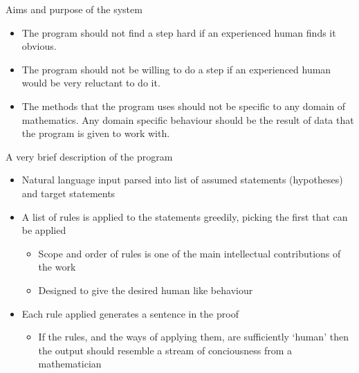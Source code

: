 \begin{frame}{Aims and purpose of the system}
  \begin{itemize}
    \item The program should not find a step hard if an experienced human finds it obvious.
    \vspace{2\baselineskip}
    \item The program should not be willing to do a step if an experienced human would be very reluctant to do it.
    \vspace{2\baselineskip}
    \item The methods that the program uses should not be specific to any domain of mathematics. Any domain specific behaviour should be the result of data that the program is given to work with.
  \end{itemize}
\end{frame}

\begin{frame}{A very brief description of the program}
  \begin{itemize}
    \item Natural language input parsed into list of assumed statements (hypotheses) and target statements
    \vspace{1\baselineskip}
    \item A list of rules is applied to the statements greedily, picking the first that can be applied
    \begin{itemize}
      \item Scope and order of rules is one of the main intellectual contributions of the work
      \item Designed to give the desired human like behaviour
    \end{itemize}
    \vspace{1\baselineskip}
    \item Each rule applied generates a sentence in the proof
    \begin{itemize}
      \item If the rules, and the ways of applying them, are sufficiently `human' then the output should resemble a stream of conciousness from a mathematician
    \end{itemize}
  \end{itemize}
\end{frame}


